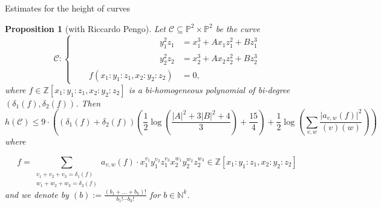\documentclass[handout]{beamer}
\newtheorem{prop}{Proposition}
\begin{document}
\begin{frame}{Estimates for the height of  curves}


\begin{prop}[with Riccardo Pengo] 

Let $\mathcal{C} \subseteq \mathbb{P}^2 \times \mathbb{P}^2$ be the curve
	\begin{equation*} \label{eq:curve_C}
		\mathcal{C} \colon \begin{cases}
			\phantom{P(x_1 \colon y_1 \colon z_1,x_2 \colon y_2 \colon z_2)}y_1^2 z_1 &= x_1^3 + A x_1 z_1^2 + B z_1^3 \\
			\phantom{P(x_1 \colon y_1 \colon z_1,x_2 \colon y_2 \colon z_2)}y_2^2 z_2 &= x_2^3 + A x_2 z_2^2 + B z_2^3 \\
			\phantom{y_1^2 z_1}f(x_1 \colon y_1 \colon z_1,x_2 \colon y_2 \colon z_2) &= 0,
		\end{cases}
	\end{equation*}
	where $f \in  \mathbb{Z}[x_1 \colon y_1 \colon z_1,x_2 \colon y_2 \colon z_2]$ is a bi-homogeneous polynomial of bi-degree $(\delta_1(f),\delta_2(f))$. Then
	\[
		h(\mathcal{C}) \leq 9 \cdot \left((\delta_1(f) + \delta_2(f)) \left(\frac{1}{2} \log\left( \frac{\lvert A \rvert^2  + 3 \lvert B \rvert ^2 + 4}{3} \right) + \frac{15}{4}\right) + \frac{1}{2} \log\left( \sum_{v,w} \frac{\lvert a_{v,w}(f) \rvert^2}{(v) (w)} \right)\right)
	\]
	where 
	
	\[
		f = \sum_{\substack{v_1 + v_2 + v_3 = \delta_1(f) \\ w_1 + w_2 + w_3 = \delta_2(f)}} a_{v,w}(f) \cdot x_1^{v_1} y_1^{v_2} z_1^{v_3} x_2^{w_1} y_2^{w_2} z_2^{w_3} \in \mathbb{Z}[x_1 \colon y_1 \colon z_1,x_2 \colon y_2 \colon z_2]
	\] and  we denote by $(b) := \frac{(b_1+\dots+b_k)!}{b_1! \cdots b_k!}$ for $b\in \mathbb{N}^k$.

\end{prop}
	
	

\end{frame}
\end{document}
